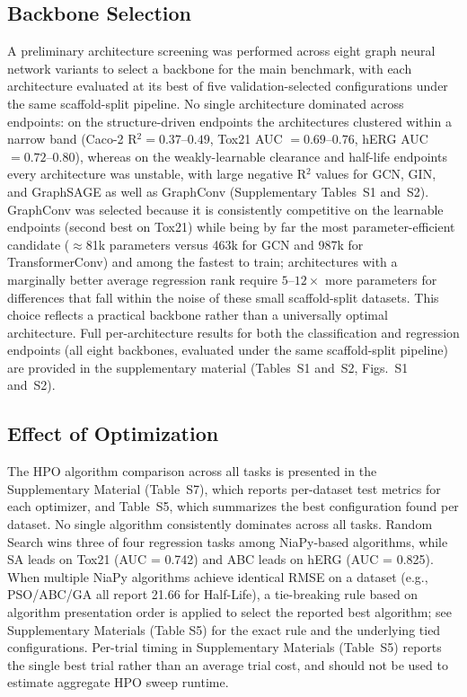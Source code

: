 \documentclass[journal]{IEEEtran}
\begin{document}
\subsection{Backbone Selection}
\label{sec:arch_selection}

A preliminary architecture screening was performed across eight graph neural network variants to select a backbone for the main benchmark, with each architecture evaluated at its best of five validation-selected configurations under the same scaffold-split pipeline. No single architecture dominated across endpoints: on the structure-driven endpoints the architectures clustered within a narrow band (Caco-2 R$^2 = 0.37$--$0.49$, Tox21 AUC $= 0.69$--$0.76$, hERG AUC $= 0.72$--$0.80$), whereas on the weakly-learnable clearance and half-life endpoints every architecture was unstable, with large negative R$^2$ values for GCN, GIN, and GraphSAGE as well as GraphConv (Supplementary Tables~S1 and~S2). GraphConv was selected because it is consistently competitive on the learnable endpoints (second best on Tox21) while being by far the most parameter-efficient candidate ($\approx$81k parameters versus 463k for GCN and 987k for TransformerConv) and among the fastest to train; architectures with a marginally better average regression rank require $5$--$12\times$ more parameters for differences that fall within the noise of these small scaffold-split datasets. This choice reflects a practical backbone rather than a universally optimal architecture. Full per-architecture results for both the classification and regression endpoints (all eight backbones, evaluated under the same scaffold-split pipeline) are provided in the supplementary material (Tables~S1 and~S2, Figs.~S1 and~S2).

\subsection{Effect of Optimization}
\label{sec:optimization}

The HPO algorithm comparison across all tasks is presented in the Supplementary Material (Table~S7), which reports per-dataset test metrics for each optimizer, and Table~S5, which summarizes the best configuration found per dataset. No single algorithm consistently dominates across all tasks. Random Search wins three of four regression tasks among NiaPy-based algorithms, while SA leads on Tox21 (AUC = 0.742) and ABC leads on hERG (AUC = 0.825). When multiple NiaPy algorithms achieve identical RMSE on a dataset (e.g., PSO/ABC/GA all report 21.66 for Half-Life), a tie-breaking rule based on algorithm presentation order is applied to select the reported best algorithm; see Supplementary Materials (Table S5) for the exact rule and the underlying tied configurations. Per-trial timing in Supplementary Materials (Table~S5) reports the single best trial rather than an average trial cost, and should not be used to estimate aggregate HPO sweep runtime.
\end{document}
